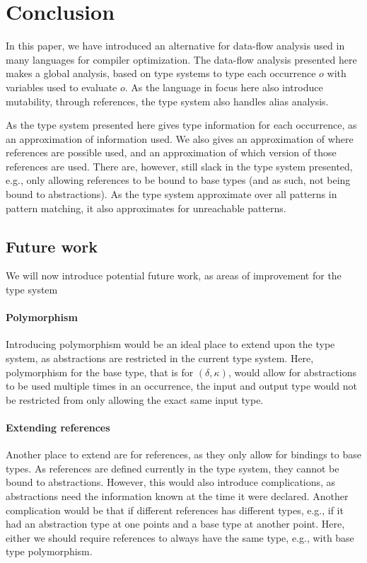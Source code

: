 \documentclass[../../master.tex]{subfiles}
\begin{document}
\section{Conclusion}\label{sec:Conc}
In this paper, we have introduced an alternative for data-flow analysis used in many languages for compiler optimization.
The data-flow analysis presented here makes a global analysis, based on type systems to type each occurrence $o$ with variables used to evaluate $o$.
As the language in focus here also introduce mutability, through references, the type system also handles alias analysis.

As the type system presented here gives type information for each occurrence, as an approximation of information used.
We also gives an approximation of where references are possible used, and an approximation of which version of those references are used.
There are, however, still slack in the type system presented, e.g., only allowing references to be bound to base types (and as such, not being bound to abstractions).
As the type system approximate over all patterns in pattern matching, it also approximates for unreachable patterns.

\subsection{Future work}\label{sec:FW}
We will now introduce potential future work, as areas of improvement for the type system

\paragraph{Polymorphism}
Introducing polymorphism would be an ideal place to extend upon the type system, as abstractions are restricted in the current type system.
Here, polymorphism for the base type, that is for $(\delta,\kappa)$, would allow for abstractions to be used multiple times in an occurrence, the input and output type would not be restricted from only allowing the exact same input type.

\paragraph{Extending references}
Another place to extend are for references, as they only allow for bindings to base types.
As references are defined currently in the type system, they cannot be bound to abstractions.
However, this would also introduce complications, as abstractions need the information known at the time it were declared.
Another complication would be that if different references has different types, e.g., if it had an abstraction type at one points and a base type at another point.
Here, either we should require references to always have the same type, e.g., with base type polymorphism.
\end{document}
